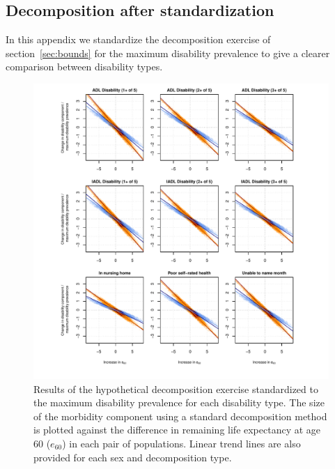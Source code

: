 \documentclass[11pt,oneside,a4paper]{article} %
\begin{document}
\begin{appendices}

\section{Decomposition after standardization}
In this appendix we standardize the decomposition exercise of section~\ref{sec:bounds} for the maximum
disability prevalence to give a clearer comparison between disability types.
\begin{figure}
\begin{adjustwidth}{-1.5cm}{}
	\centering
	\includegraphics[scale=.8]{Figures/Decomp_3x3_rel.pdf}
	\caption{Results of the hypothetical decomposition exercise standardized to the maximum disability prevalence for each disability type. The size of the
	morbidity component using a standard decomposition method is plotted against
	the difference in remaining life expectancy at age 60 ($e_{60}$) in each
	pair of populations. Linear trend lines are also provided for each sex and decomposition type.}
	\label{fig:Fig_Decomp_3x3_rel}
\end{adjustwidth}
\end{figure}



\end{appendices}
\end{document}
